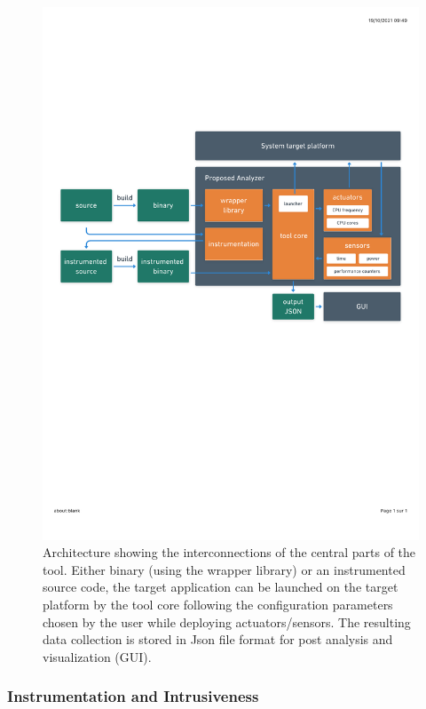 \begin{figure}[H]	
	\includegraphics[scale=0.7]{pascalanalyzer/figures/designfeatures/pascal_philosophy.pdf}
	\caption{Architecture showing the interconnections of the central parts of the tool. Either binary (using the wrapper library) or an instrumented source code, the target application can be launched on the target platform by the tool core following the configuration parameters chosen by the user while deploying actuators/sensors. The resulting data collection is stored in Json file format for post analysis and visualization (GUI). \label{fig:pascal_architecture}}
\end{figure} 

\subsubsection{Instrumentation and Intrusiveness} \label{subsec:intrusiveness_pascal}

